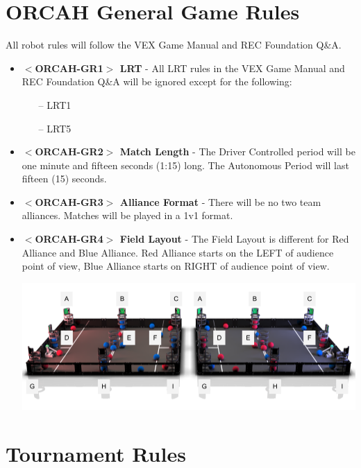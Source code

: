 \documentclass[letterpaper, 12pt]{article}
\begin{document}
\newpage

\section{ORCAH General Game Rules}
All robot rules will follow the VEX Game Manual and REC Foundation Q\&A.

\begin{itemize}[label={}]

\item\textbf{$<$ORCAH-GR1$>$ LRT} - All LRT rules in the VEX Game Manual and REC Foundation Q\&A will be ignored except for the following:
\begin{itemize}
\item[--] LRT1
\item[--] LRT5
\end{itemize}

\item\textbf{$<$ORCAH-GR2$>$ Match Length} - The Driver Controlled period will be one minute and fifteen seconds (1:15) long. The Autonomous Period will last fifteen (15) seconds.

\item\textbf{$<$ORCAH-GR3$>$ Alliance Format} - There will be no two team alliances.  Matches will be played in a 1v1 format. 

\item\textbf{$<$ORCAH-GR4$>$ Field Layout} - The Field Layout is different for Red Alliance and Blue Alliance.  Red Alliance starts on the LEFT of audience point of view, Blue Alliance starts on RIGHT of audience point of view.

\begin{center}
\includegraphics[scale=0.5]{labels}
\end{center}

\end{itemize}

\newpage

\section{Tournament Rules}
\end{document}
